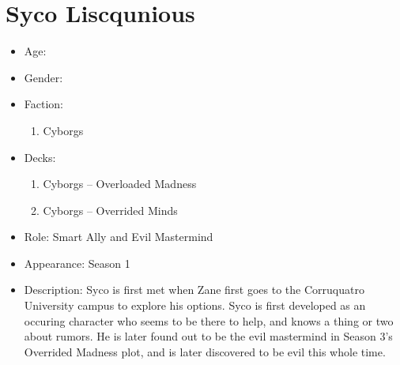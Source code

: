 \section{Syco Liscqunious}
\begin{itemize}
	\item Age:
	\item Gender:
	\item Faction:
	      \begin{enumerate}
		      \item Cyborgs
	      \end{enumerate}
	\item Decks:
	      \begin{enumerate}
		      \item Cyborgs – Overloaded Madness
		      \item Cyborgs – Overrided Minds
	      \end{enumerate}
	\item Role: Smart Ally and Evil Mastermind
	\item Appearance: Season 1
	\item Description: Syco is first met when Zane first goes to the Corruquatro
	      University campus to explore his options. Syco is first developed as an occuring
	      character who seems to be there to help, and knows a thing or two about rumors. He is later
	      found out to be the evil mastermind in Season 3's Overrided Madness plot, and is later discovered
	      to be evil this whole time.
\end{itemize}
\newpage